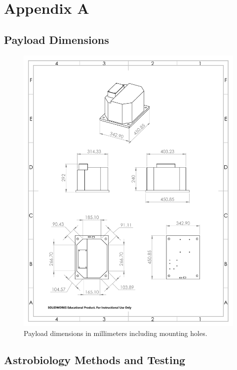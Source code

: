 \newpage
\section{Appendix A}
\label{sec:Appendix A}

\subsection{Payload Dimensions}
\begin{figure}[!h]
\begin{center}
\includegraphics[scale=.6]{./Figures/Payload_Dim.pdf}
\caption{Payload dimensions in millimeters including mounting holes.}
\label{fig:payload_dim}
\end{center}
\end{figure}

\newpage
\subsection{Astrobiology Methods and Testing}

